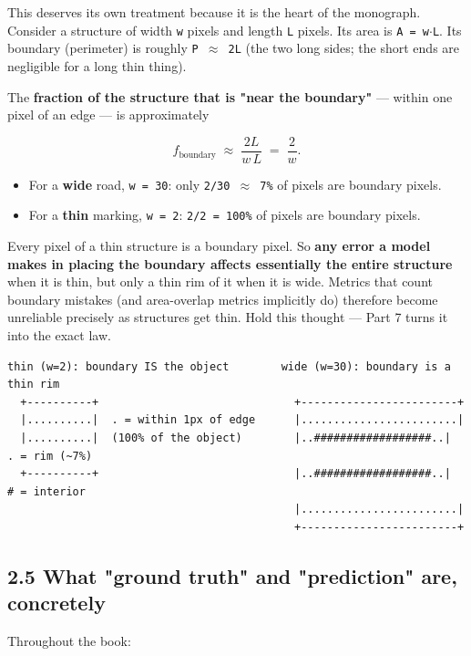 \documentclass[11pt]{article}
\begin{document}
This deserves its own treatment because it is the heart of the monograph. Consider a structure of width \texttt{w} pixels and length \texttt{L} pixels. Its area is \texttt{A = w$\cdot$L}. Its boundary (perimeter) is roughly \texttt{P $\approx$ 2L} (the two long sides; the short ends are negligible for a long thin thing).

The \textbf{fraction of the structure that is "near the boundary"} --- within one pixel of an edge --- is approximately

\[f_\text{boundary} \;\approx\; \frac{2L}{w\,L} \;=\; \frac{2}{w}.\]

\begin{itemize}\setlength{\itemsep}{1pt}
\item For a \textbf{wide} road, \texttt{w = 30}: only \texttt{2/30 $\approx$ 7\%} of pixels are boundary pixels.
\item For a \textbf{thin} marking, \texttt{w = 2}: \texttt{2/2 = 100\%} of pixels are boundary pixels.
\end{itemize}

Every pixel of a thin structure is a boundary pixel. So \textbf{any error a model makes in placing the boundary affects essentially the entire structure} when it is thin, but only a thin rim of it when it is wide. Metrics that count boundary mistakes (and area-overlap metrics implicitly do) therefore become unreliable precisely as structures get thin. Hold this thought --- Part 7 turns it into the exact law.

\begin{Verbatim}[breaklines=true,breakanywhere=true,fontsize=\footnotesize]
  thin (w=2): boundary IS the object        wide (w=30): boundary is a thin rim
  +----------+                              +------------------------+
  |..........|  . = within 1px of edge      |........................|
  |..........|  (100% of the object)        |..##################..|  . = rim (~7%)
  +----------+                              |..##################..|  # = interior
                                            |........................|
                                            +------------------------+
\end{Verbatim}

\subsection*{2.5 What "ground truth" and "prediction" are, concretely}

Throughout the book:
\end{document}
